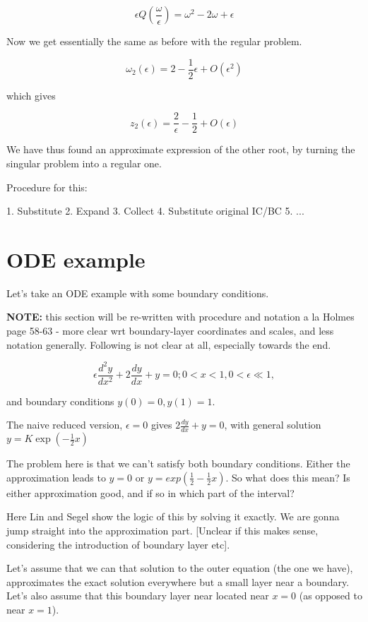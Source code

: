 \documentclass[12pt]{report}
\begin{document}
$$\epsilon Q(\frac \omega \epsilon) = \omega^2 - 2\omega + \epsilon$$

Now we get essentially the same as before with the regular problem.

$$\omega_2(\epsilon) = 2 - \frac 1 2 \epsilon + O(\epsilon^2)$$

which gives

$$z_2(\epsilon) = \frac 2 \epsilon - \frac 1 2 + O(\epsilon)$$

We have thus found an approximate expression of the other root, by
turning the singular problem into a regular one.

Procedure for this:

1. Substitute 2. Expand 3. Collect 4. Substitute original IC/BC 5. ...

\section{ODE example}

Let's take an ODE example with some boundary conditions.

\textbf{NOTE:} this section will be re-written with procedure and
notation a la Holmes page 58-63 - more clear wrt boundary-layer
coordinates and scales, and less notation generally. Following is not
clear at all, especially towards the end.

\begin{equation}
  \epsilon \frac{d^2y}{dx^2} + 2 \frac{dy}{dx} + y = 0; 0 < x < 1, 0
  < \epsilon \ll 1,
\end{equation}

and boundary conditions $y(0)=0, y(1) =1$.

The naive reduced version, $\epsilon = 0$ gives $2 \frac{dy}{dx} + y =
0$, with general solution $y=K \exp(-\frac{1}{2} x)$

The problem here is that we can't satisfy both boundary
conditions. Either the approximation leads to $y=0$ or $y=exp(\frac 1
2 - \frac 1 2 x)$. So what does this mean? Is either approximation
good, and if so in which part of the interval?

Here Lin and Segel show the logic of this by solving it exactly. We
are gonna jump straight into the approximation part. [Unclear if this
  makes sense, considering the introduction of boundary layer etc].

Let's assume that we can that solution to the outer equation (the one
we have), approximates the exact solution everywhere but a small layer
near a boundary.  Let's also assume that this boundary layer near
located near $x=0$ (as opposed to near $x=1$).
\end{document}
